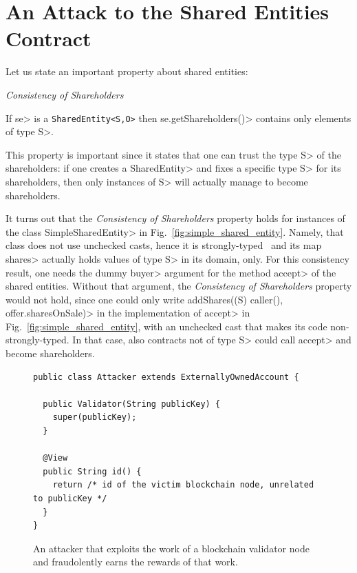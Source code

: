 \section{An Attack to the Shared Entities Contract}\label{sec:attack}

Let us state an important property about shared entities:
%
\vspace{2ex}
\begin{mdframed}[leftmargin=10pt,rightmargin=10pt]
  \begin{center}\emph{Consistency of Shareholders}\end{center}
  \noindent
  If \<se> is a {\codesize\texttt{SharedEntity<S,O>}}
  then \<se.getShareholders()> contains only elements of type \<S>.
\end{mdframed}
\vspace{2ex}
%
This property is important since it states that one can trust the type \<S> of
the shareholders: if one creates a \<SharedEntity> and fixes a specific type \<S>
for its shareholders, then only instances of \<S> will actually manage to become shareholders.

It turns out that the \emph{Consistency of Shareholders} property holds
for instances of the class \<SimpleSharedEntity> in Fig.~\ref{fig:simple_shared_entity}.
Namely, that class does not use unchecked casts, hence it is strongly-typed~\cite{NaftalinW06} and
its map \<shares> actually holds values of type \<S> in its domain, only.
For this consistency result, one needs
the dummy \<buyer> argument for the method \<accept>
of the shared entities. Without that argument, the
\emph{Consistency of Shareholders} property would not hold, since one could only write
\<addShares((S) caller(), offer.sharesOnSale)> in the implementation of \<accept> in
Fig.~\ref{fig:simple_shared_entity}, with an unchecked cast that makes its code
non-strongly-typed. In that case, also contracts not of type \<S> could call \<accept>
and become shareholders.

\begin{figure}[ht]
  \begin{center}
    \begin{lstlisting}[language=Takamaka]
public class Attacker extends ExternallyOwnedAccount {

  public Validator(String publicKey) {
    super(publicKey);
  }

  @View
  public String id() {
    return /* id of the victim blockchain node, unrelated to publicKey */
  }
}
    \end{lstlisting}
  \end{center}
  \caption{An attacker that exploits the work of a blockchain validator node and fraudolently earns the rewards of that work.}\label{fig:attacker}
\end{figure}

